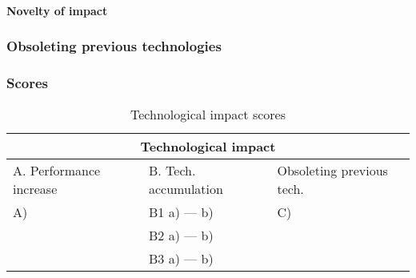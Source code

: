 \paragraph{Novelty of impact}

\subsubsection{Obsoleting previous technologies}

\subsubsection{Scores}
\begin{table}[h]
\centering
\begin{tabular}{l l l}
\hline
\multicolumn{3}{|c|}{Technological impact} \\
\hline
A. Performance increase & B. Tech. accumulation & Obsoleting previous tech.\\
A)   & B1 a)  --- b)  & C) \\ 
     & B2 a)  --- b)  & \\
     & B3 a)  --- b)  & \\
\hline
\end{tabular}
\caption{Technological impact scores}
\label{tbl:impactscores3}
\end{table}